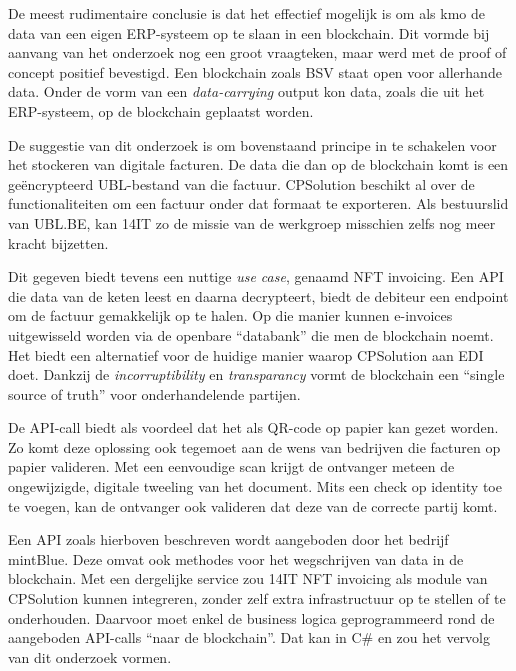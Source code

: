 De meest rudimentaire conclusie is dat het effectief mogelijk is om als kmo de data van een eigen ERP-systeem op te slaan in een blockchain. Dit vormde bij aanvang van het onderzoek nog een groot vraagteken, maar werd met de proof of concept positief bevestigd. Een blockchain zoals BSV staat open voor allerhande data. Onder de vorm van een \textit{data-carrying} output kon data, zoals die uit het ERP-systeem, op de blockchain geplaatst worden. 

De suggestie van dit onderzoek is om bovenstaand principe in te schakelen voor het stockeren van digitale facturen. De data die dan op de blockchain komt is een geëncrypteerd UBL-bestand van die factuur. CPSolution beschikt al over de functionaliteiten om een factuur onder dat formaat te exporteren. Als bestuurslid van UBL.BE, kan 14IT zo de missie van de werkgroep misschien zelfs nog meer kracht bijzetten.

Dit gegeven biedt tevens een nuttige \textit{use case}, genaamd NFT invoicing. Een API die data van de keten leest en daarna decrypteert, biedt de debiteur een endpoint om de factuur gemakkelijk op te halen. Op die manier kunnen e-invoices uitgewisseld worden via de openbare ``databank'' die men de blockchain noemt. Het biedt een alternatief voor de huidige manier waarop CPSolution aan EDI doet. Dankzij de \textit{incorruptibility} en \textit{transparancy} vormt de blockchain een ``single source of truth'' voor onderhandelende partijen.

De API-call biedt als voordeel dat het als QR-code op papier kan gezet worden. Zo komt deze oplossing ook tegemoet aan de wens van bedrijven die facturen op papier valideren. Met een eenvoudige scan krijgt de ontvanger meteen de ongewijzigde, digitale tweeling van het document. Mits een check op identity toe te voegen, kan de ontvanger ook valideren dat deze van de correcte partij komt.

Een API zoals hierboven beschreven wordt aangeboden door het bedrijf mintBlue. Deze omvat ook methodes voor het wegschrijven van data in de blockchain. Met een dergelijke service zou 14IT NFT invoicing als module van CPSolution kunnen integreren, zonder zelf extra infrastructuur op te stellen of te onderhouden. Daarvoor moet enkel de business logica geprogrammeerd rond de aangeboden API-calls ``naar de blockchain''. Dat kan in C\# en zou het vervolg van dit onderzoek vormen.